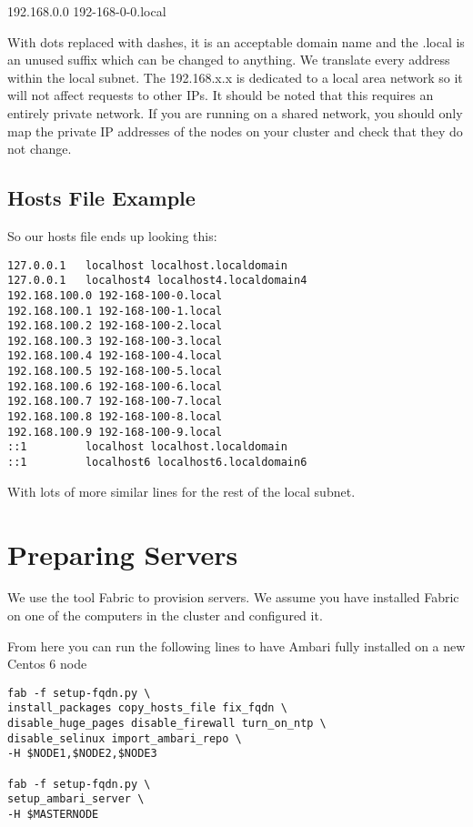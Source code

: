 \documentclass[9pt,twocolumn,twoside]{idsi}
\begin{document}
192.168.0.0 192-168-0-0.local

With dots replaced with dashes, it is an acceptable domain name and the .local is an unused suffix which can be changed to anything. We translate every address within the local subnet. The 192.168.x.x is dedicated to a local area network so it will not affect requests to other IPs. It should be noted that this requires an entirely private network. If you are running on a shared network, you should only map the private IP addresses of the nodes on your cluster and check that they do not change.


\subsection{Hosts File Example}

So our hosts file ends up looking this:
\begin{verbatim}
127.0.0.1   localhost localhost.localdomain
127.0.0.1   localhost4 localhost4.localdomain4
192.168.100.0 192-168-100-0.local
192.168.100.1 192-168-100-1.local
192.168.100.2 192-168-100-2.local
192.168.100.3 192-168-100-3.local
192.168.100.4 192-168-100-4.local
192.168.100.5 192-168-100-5.local
192.168.100.6 192-168-100-6.local
192.168.100.7 192-168-100-7.local
192.168.100.8 192-168-100-8.local
192.168.100.9 192-168-100-9.local
::1         localhost localhost.localdomain 
::1         localhost6 localhost6.localdomain6
\end{verbatim}

With lots of more similar lines for the rest of the local subnet.

\section{Preparing Servers}

We use the tool Fabric to provision servers. We assume you have installed Fabric on one of the computers in the cluster and configured it.

From here you can run the following lines to have Ambari fully installed on a new Centos 6 node

\begin{verbatim}
fab -f setup-fqdn.py \
install_packages copy_hosts_file fix_fqdn \
disable_huge_pages disable_firewall turn_on_ntp \
disable_selinux import_ambari_repo \
-H $NODE1,$NODE2,$NODE3

fab -f setup-fqdn.py \
setup_ambari_server \
-H $MASTERNODE

\end{verbatim}
\end{document}
